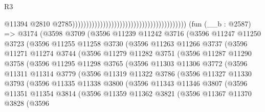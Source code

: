 \begin{lexlean}{R3}
\begin{coremodule}
                                                                                      @11394
                                                                                      @2810
                                                                                      @2785)))))))))))))))))))))))))))))))))))))))))
    (fun (__b : @2587) =>
    @3174
      (@3598
        @3709
        (@3596
          @11239
          @11242
          @3716
          (@3596
            @11247
            @11250
            @3723
            (@3596
              @11255
              @11258
              @3730
              (@3596
                @11263
                @11266
                @3737
                (@3596
                  @11271
                  @11274
                  @3744
                  (@3596
                    @11279
                    @11282
                    @3751
                    (@3596
                      @11287
                      @11290
                      @3758
                      (@3596
                        @11295
                        @11298
                        @3765
                        (@3596
                          @11303
                          @11306
                          @3772
                          (@3596
                            @11311
                            @11314
                            @3779
                            (@3596
                              @11319
                              @11322
                              @3786
                              (@3596
                                @11327
                                @11330
                                @3793
                                (@3596
                                  @11335
                                  @11338
                                  @3800
                                  (@3596
                                    @11343
                                    @11346
                                    @3807
                                    (@3596
                                      @11351
                                      @11354
                                      @3814
                                      (@3596
                                        @11359
                                        @11362
                                        @3821
                                        (@3596
                                          @11367
                                          @11370
                                          @3828
                                          (@3596

\end{coremodule}
\end{lexlean}
